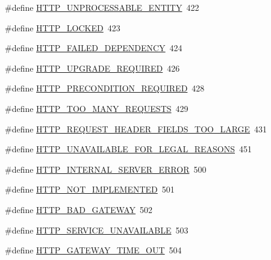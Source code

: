 \begin{DoxyCompactItemize}
\item 
\#define \hyperlink{group__HTTP__Status_gac4022ba243c3221e89a00b9942e9b52b}{H\+T\+T\+P\+\_\+\+U\+N\+P\+R\+O\+C\+E\+S\+S\+A\+B\+L\+E\+\_\+\+E\+N\+T\+I\+TY}~422
\item 
\#define \hyperlink{group__HTTP__Status_ga7cbb0c030f5a67eaa7dfecb406edf75d}{H\+T\+T\+P\+\_\+\+L\+O\+C\+K\+ED}~423
\item 
\#define \hyperlink{group__HTTP__Status_ga786b81d7e7cb5c5ade4d914d10af4a17}{H\+T\+T\+P\+\_\+\+F\+A\+I\+L\+E\+D\+\_\+\+D\+E\+P\+E\+N\+D\+E\+N\+CY}~424
\item 
\#define \hyperlink{group__HTTP__Status_ga41c1cca4c30e8f491d57a3eab3b98d2d}{H\+T\+T\+P\+\_\+\+U\+P\+G\+R\+A\+D\+E\+\_\+\+R\+E\+Q\+U\+I\+R\+ED}~426
\item 
\#define \hyperlink{group__HTTP__Status_ga3c4821f80c3c1b8cf7ded01031a6e9e4}{H\+T\+T\+P\+\_\+\+P\+R\+E\+C\+O\+N\+D\+I\+T\+I\+O\+N\+\_\+\+R\+E\+Q\+U\+I\+R\+ED}~428
\item 
\#define \hyperlink{group__HTTP__Status_ga7ec0ca4de6248d9441c5b227e5deaf04}{H\+T\+T\+P\+\_\+\+T\+O\+O\+\_\+\+M\+A\+N\+Y\+\_\+\+R\+E\+Q\+U\+E\+S\+TS}~429
\item 
\#define \hyperlink{group__HTTP__Status_ga5f8382d54057ed1be5318a3ca3140e20}{H\+T\+T\+P\+\_\+\+R\+E\+Q\+U\+E\+S\+T\+\_\+\+H\+E\+A\+D\+E\+R\+\_\+\+F\+I\+E\+L\+D\+S\+\_\+\+T\+O\+O\+\_\+\+L\+A\+R\+GE}~431
\item 
\#define \hyperlink{group__HTTP__Status_ga2db5183e84d14a1e2195329897405094}{H\+T\+T\+P\+\_\+\+U\+N\+A\+V\+A\+I\+L\+A\+B\+L\+E\+\_\+\+F\+O\+R\+\_\+\+L\+E\+G\+A\+L\+\_\+\+R\+E\+A\+S\+O\+NS}~451
\item 
\#define \hyperlink{group__HTTP__Status_ga5d9777e02c26063c2985e39ef71091d2}{H\+T\+T\+P\+\_\+\+I\+N\+T\+E\+R\+N\+A\+L\+\_\+\+S\+E\+R\+V\+E\+R\+\_\+\+E\+R\+R\+OR}~500
\item 
\#define \hyperlink{group__HTTP__Status_gad8950a9ac05b1fe42c9a39dc7d8cbddf}{H\+T\+T\+P\+\_\+\+N\+O\+T\+\_\+\+I\+M\+P\+L\+E\+M\+E\+N\+T\+ED}~501
\item 
\#define \hyperlink{group__HTTP__Status_ga57ddfb82346d6efc864c3e164e574b10}{H\+T\+T\+P\+\_\+\+B\+A\+D\+\_\+\+G\+A\+T\+E\+W\+AY}~502
\item 
\#define \hyperlink{group__HTTP__Status_ga127ebc3e72d77c04cbabbf43082d35fe}{H\+T\+T\+P\+\_\+\+S\+E\+R\+V\+I\+C\+E\+\_\+\+U\+N\+A\+V\+A\+I\+L\+A\+B\+LE}~503
\item 
\#define \hyperlink{group__HTTP__Status_gaaf973dd6df946c88224a4b761bb079fc}{H\+T\+T\+P\+\_\+\+G\+A\+T\+E\+W\+A\+Y\+\_\+\+T\+I\+M\+E\+\_\+\+O\+UT}~504

\end{DoxyCompactItemize}
